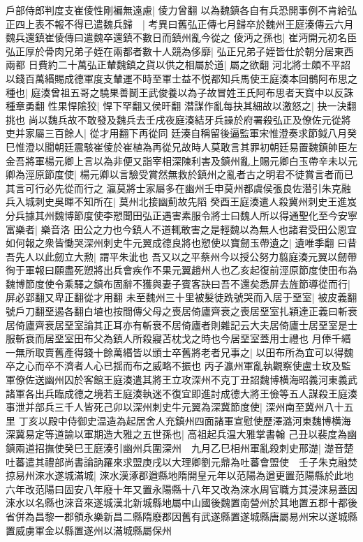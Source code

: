 戶部侍郎判度支崔倰性剛褊無遠慮|{
	倰力曾翻}
以為魏鎮各自有兵恐開事例不肯給弘正四上表不報不得已遣魏兵歸　|{
	考異曰舊弘正傳七月歸卒於魏州王庭湊傳云六月魏兵還鎮崔倰傳曰遣魏卒還鎮不數日而鎮州亂今從之}
倰沔之孫也|{
	崔沔開元初名臣}
弘正厚於骨肉兄弟子姪在兩都者數十人競為侈靡|{
	弘正兄弟子姪皆仕於朝分居東西兩都}
日費約二十萬弘正輦魏鎮之貨以供之相屬於道|{
	屬之欲翻}
河北將士頗不平詔以錢百萬緡賜成德軍度支輦運不時至軍士益不悦都知兵馬使王庭湊本回鶻阿布思之種也|{
	庭湊曾祖五哥之驍果善鬭王武俊養以為子故冒姓王氏阿布思者天寶中以反誅種章勇翻}
性果悍隂狡|{
	悍下罕翻又侯旰翻}
潜謀作亂每抉其細故以激怒之|{
	抉一決翻挑也}
尚以魏兵故不敢發及魏兵去壬戌夜庭湊結牙兵譟於府署殺弘正及僚佐元從將吏并家屬三百餘人|{
	從才用翻下再從同}
廷湊自稱留後逼監軍宋惟澄奏求節鉞八月癸巳惟澄以聞朝廷震駭崔倰於崔植為再從兄故時人莫敢言其罪初朝廷易置魏鎮帥臣左金吾將軍楊元卿上言以為非便又詣宰相深陳利害及鎮州亂上賜元卿白玉帶辛未以元卿為涇原節度使|{
	楊元卿以言驗受賞然無救於鎮州之亂者古之明君不徒賞言者而已其言可行必先從而行之}
瀛莫將士家屬多在幽州壬申莫州都虞侯張良佐潜引朱克融兵入城刺史吳暉不知所在|{
	莫州北接幽薊故先䧟}
癸酉王庭湊遣人殺冀州刺史王進岌分兵據其州魏博節度使李愬聞田弘正遇害素服令將士曰魏人所以得通聖化至今安寧富樂者|{
	樂音洛}
田公之力也今鎮人不道輒敢害之是輕魏以為無人也諸君受田公恩宜如何報之衆皆慟哭深州刺史牛元翼成德良將也愬使以寶劒玉帶遺之|{
	遺唯季翻}
曰昔吾先人以此劒立大勲|{
	謂平朱泚也}
吾又以之平蔡州今以授公努力翦庭湊元翼以劒帶徇于軍報曰願盡死愬將出兵會疾作不果元翼趙州人也乙亥起復前涇原節度使田布為魏博節度使令乘驛之鎮布固辭不獲與妻子賓客訣曰吾不還矣悉屏去旌節導從而行|{
	屏必郢翻又卑正翻從才用翻}
未至魏州三十里被髮徒跣號哭而入居于堊室|{
	被皮義翻號戶刀翻堊遏各翻白埴也按間傳父母之喪居倚廬齊衰之喪居堊室扎穎達正義曰斬衰居倚廬齊衰居堊室論其正耳亦有斬衰不居倚廬者則雜記云大夫居倚廬士居堊室是士服斬衰而居堊室田布父為鎮人所殺寢苫枕戈之時也今居堊室蓋用士禮也}
月俸千緡一無所取賣舊產得錢十餘萬緡皆以頒士卒舊將老者兄事之|{
	以田布所為宜可以得魏卒之心而卒不濟者人心已揺而布之威略不振也}
丙子瀛州軍亂執觀察使盧士玫及監軍僚佐送幽州囚於客館王庭湊遣其將王立攻深州不克丁丑詔魏博横海昭義河東義武諸軍各出兵臨成德之境若王庭湊執迷不復宜即進討成德大將王儉等五人謀殺王庭湊事泄并部兵三千人皆死己卯以深州刺史牛元翼為深冀節度使|{
	深州南至冀州八十五里}
丁亥以殿中侍御史温造為起居舍人充鎮州四面諸軍宣慰使歷澤潞河東魏博横海深冀易定等道諭以軍期造大雅之五世孫也|{
	高祖起兵温大雅掌書翰}
己丑以裴度為幽鎮兩道招撫使癸巳王庭湊引幽州兵圍深州　九月乙巳相州軍亂殺刺史邢濋|{
	濋音楚}
吐蕃遣其禮部尚書論訥羅來求盟庚戌以大理卿劉元鼎為吐蕃會盟使　壬子朱克融焚掠易州淶水遂城滿城|{
	淶水漢涿郡遒縣地隋開皇元年以范陽為遒更置范陽縣於此地六年改范陽曰固安八年廢十年又置永陽縣十八年又改為淶水周官職方其浸淶易蓋因淶水以名縣也淶音來遂城漢北新城縣地屬中山國後魏置南營州於其地置五郡十都後省併為昌黎一郡領永樂新昌二縣隋廢郡因舊有武遂縣置遂城縣唐屬易州宋以遂城縣置威虜軍金以縣置遂州以滿城縣屬保州}
